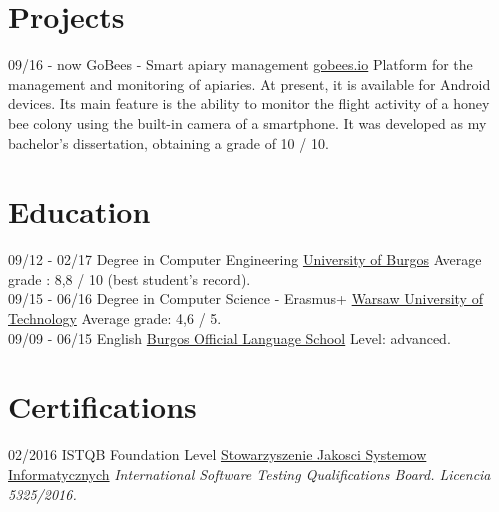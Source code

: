 \documentclass[]{friggeri-cv}
\begin{document}
\section{Projects}
\begin{entrylist}
  \entry
    {09/16 - now}
    {GoBees - Smart apiary management}
    {\href{http://gobees.io/}{gobees.io}}
    {Platform for the management and monitoring of apiaries. At present, it is available for Android devices. Its main feature is the ability to monitor the flight activity of a honey bee colony using the built-in camera of a smartphone. It was developed as my bachelor's dissertation, obtaining a grade of 10 / 10.}
\end{entrylist}

\section{Education}
\begin{entrylist}
  \entry
    {09/12 - 02/17}
    {Degree in Computer Engineering}
    {\href{http://wwww.ubu.es/}{University of Burgos}}
    {Average grade : 8,8 / 10 (best student’s record).\\}
  \entry
    {09/15 - 06/16}
    {Degree in Computer Science - Erasmus+}
    {\href{https://www.pw.edu.pl/}{Warsaw University of Technology}}
    {Average grade: 4,6 / 5.\\}
  \entry
    {09/09 - 06/15}
    {English}
    {\href{http://eoiburgos.centros.educa.jcyl.es/}{Burgos Official Language School}}
    {Level: advanced.\\}
\end{entrylist}

\section{Certifications}
\begin{entrylist}
  \entry
    {02/2016}
    {ISTQB Foundation Level}
    {\href{http://sjsi.org/}{Stowarzyszenie Jakosci Systemow Informatycznych}}
    {\emph{International Software Testing Qualifications Board. Licencia 5325/2016.}}
\end{entrylist}

\newpage
\end{document}
